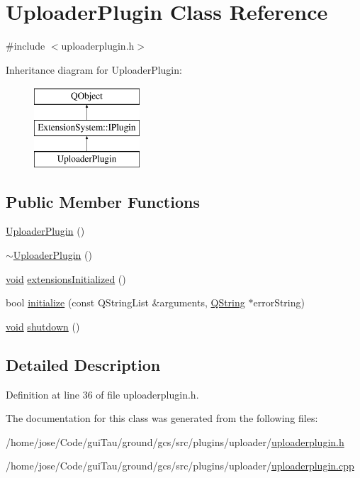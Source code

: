 \hypertarget{class_uploader_plugin}{\section{Uploader\-Plugin Class Reference}
\label{class_uploader_plugin}
}


{\ttfamily \#include $<$uploaderplugin.\-h$>$}

Inheritance diagram for Uploader\-Plugin\-:\begin{figure}[H]
\begin{center}
\leavevmode
\includegraphics[height=3.000000cm]{class_uploader_plugin}
\end{center}
\end{figure}
\subsection*{Public Member Functions}
\begin{DoxyCompactItemize}
\item 
\hyperlink{group___y_modem_uploader_ga5dbbc19d5b4c070d0326c2e8695b2a9b}{Uploader\-Plugin} ()
\item 
\hyperlink{group___y_modem_uploader_gab9ab9e0558901e7f3ca2e24750ded4e2}{$\sim$\-Uploader\-Plugin} ()
\item 
\hyperlink{group___u_a_v_objects_plugin_ga444cf2ff3f0ecbe028adce838d373f5c}{void} \hyperlink{group___y_modem_uploader_ga1e319fd52ea2d055faae5cfcc9b38041}{extensions\-Initialized} ()
\item 
bool \hyperlink{group___y_modem_uploader_gaed3cc44adfc0c7107aa35f52e5265da2}{initialize} (const Q\-String\-List \&arguments, \hyperlink{group___u_a_v_objects_plugin_gab9d252f49c333c94a72f97ce3105a32d}{Q\-String} $\ast$error\-String)
\item 
\hyperlink{group___u_a_v_objects_plugin_ga444cf2ff3f0ecbe028adce838d373f5c}{void} \hyperlink{group___y_modem_uploader_gac966b3a48b2c1de74e802f0092479ab2}{shutdown} ()
\end{DoxyCompactItemize}


\subsection{Detailed Description}


Definition at line 36 of file uploaderplugin.\-h.



The documentation for this class was generated from the following files\-:\begin{DoxyCompactItemize}
\item 
/home/jose/\-Code/gui\-Tau/ground/gcs/src/plugins/uploader/\hyperlink{uploaderplugin_8h}{uploaderplugin.\-h}\item 
/home/jose/\-Code/gui\-Tau/ground/gcs/src/plugins/uploader/\hyperlink{uploaderplugin_8cpp}{uploaderplugin.\-cpp}\end{DoxyCompactItemize}

